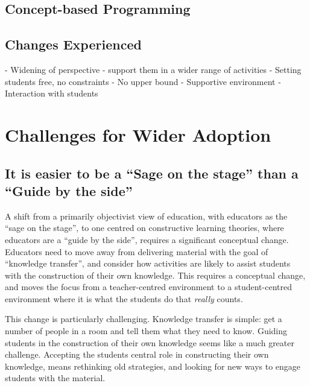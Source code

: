 \subsection{Concept-based Programming} %
\label{sub:concept_based_programming}


\subsection{Changes Experienced} %
\label{sub:changes_experienced}

- Widening of perspective - support them in a wider range of activities
- Setting students free, no constraints
- No upper bound
- Supportive environment
- Interaction with students



\clearpage
\section{Challenges for Wider Adoption} %
\label{sec:challenges_for_wider_adoption}

\subsection{It is easier to be a ``Sage on the stage'' than a ``Guide by the side''} %
\label{sub:adopting_constructive_learning_theories}

A shift from a primarily objectivist view of education, with educators as the ``sage on the stage'', to one centred on constructive learning theories, where educators are a ``guide by the side'', requires a significant conceptual change. Educators need to move away from delivering material with the goal of ``knowledge transfer'', and consider how activities are likely to assist students with the construction of their own knowledge. This requires a conceptual change, and moves the focus from a teacher-centred environment to a student-centred environment where it is what the students do that \emph{really} counts.

This change is particularly challenging. Knowledge transfer is simple: get a number of people in a room and tell them what they need to know. Guiding students in the construction of their own knowledge seems like a much greater challenge. Accepting the students central role in constructing their own knowledge, means rethinking old strategies, and looking for new ways to engage students with the material. 

